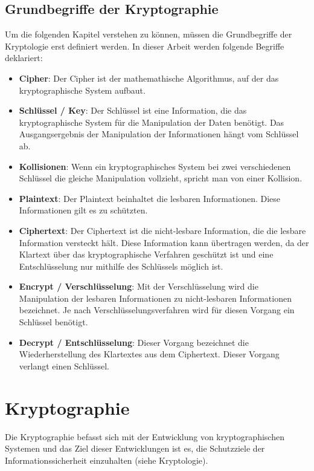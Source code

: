 \documentclass[12pt,a4paper]{report}
\begin{document}
\subsection{Grundbegriffe der Kryptographie}

Um die folgenden Kapitel verstehen zu können, müssen die Grundbegriffe der Kryptologie erst definiert werden. In dieser Arbeit werden folgende Begriffe deklariert:

\begin{itemize}
\item \textbf{Cipher}: Der Cipher ist der mathemathische Algorithmus, auf der das kryptographische System aufbaut.
\item \textbf{Schlüssel / Key}: Der Schlüssel ist eine Information, die das kryptographische System für die Manipulation der Daten benötigt. Das Ausgangsergebnis der Manipulation der Informationen hängt vom Schlüssel ab.
\item \textbf{Kollisionen}: Wenn ein kryptographisches System bei zwei verschiedenen Schlüssel die gleiche Manipulation vollzieht, spricht man von einer Kollision.
\item \textbf{Plaintext}: Der Plaintext beinhaltet die lesbaren Informationen. Diese Informationen gilt es zu schützten.
\item \textbf{Ciphertext}: Der Ciphertext ist die nicht-lesbare Information, die die lesbare Information versteckt hält. Diese Information kann übertragen werden, da der Klartext über das kryptographische Verfahren geschützt ist und eine Entschlüsselung nur mithilfe des Schlüssels möglich ist.
\item \textbf{Encrypt / Verschlüsselung}: Mit der Verschlüsselung wird die Manipulation der lesbaren Informationen zu nicht-lesbaren Informationen bezeichnet. Je nach Verschlüsselungsverfahren wird für diesen Vorgang ein Schlüssel benötigt.
\item \textbf{Decrypt / Entschlüsselung}: Dieser Vorgang bezeichnet die Wiederherstellung des Klartextes aus dem Ciphertext. Dieser Vorgang verlangt einen Schlüssel.
\end{itemize}

\section{Kryptographie}

Die Kryptographie befasst sich mit der Entwicklung von kryptographischen Systemen und das Ziel dieser Entwicklungen ist es, die Schutzziele der Informationssicherheit einzuhalten (siehe Kryptologie). \\
\end{document}
